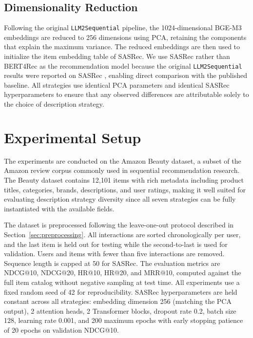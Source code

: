 \documentclass[12pt,a4paper]{report}
\begin{document}
\subsection*{Dimensionality Reduction}

Following the original \texttt{LLM2Sequential} pipeline, the 1024-dimensional
BGE-M3 embeddings are reduced to 256 dimensions using PCA, retaining the
components that explain the maximum variance. The reduced embeddings are then
used to initialize the item embedding table of SASRec. We use SASRec rather
than BERT4Rec as the recommendation model because the original
\texttt{LLM2Sequential} results were reported on SASRec \citep{boz2025},
enabling direct comparison with the published baseline. All strategies use
identical PCA parameters and identical SASRec hyperparameters to ensure that
any observed differences are attributable solely to the choice of description
strategy.

\section{Experimental Setup}
\label{sec:exp_setup_ch4}

The experiments are conducted on the Amazon Beauty dataset, a subset of the
Amazon review corpus \citep{mcauley2015image} commonly used in sequential
recommendation research. The Beauty dataset contains 12,101 items with rich
metadata including product titles, categories, brands, descriptions, and user
ratings, making it well suited for evaluating description strategy diversity
since all seven strategies can be fully instantiated with the available fields.

The dataset is preprocessed following the leave-one-out protocol described in
Section~\ref{sec:preprocessing}. All interactions are sorted chronologically
per user, and the last item is held out for testing while the second-to-last is
used for validation. Users and items with fewer than five interactions are
removed. Sequence length is capped at 50 for SASRec. The evaluation metrics are
NDCG@10, NDCG@20, HR@10, HR@20, and MRR@10, computed against the full item
catalog without negative sampling at test time. All experiments use a fixed
random seed of 42 for reproducibility. SASRec hyperparameters are held constant
across all strategies: embedding dimension 256 (matching the PCA output), 2
attention heads, 2 Transformer blocks, dropout rate 0.2, batch size 128,
learning rate 0.001, and 200 maximum epochs with early stopping patience of 20
epochs on validation NDCG@10.
\end{document}
